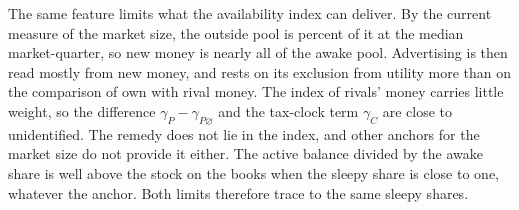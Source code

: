The same feature limits what the availability index can deliver. By the current measure of the market size, the outside pool is  percent of it at the median market-quarter, so new money is nearly all of the awake pool. Advertising is then read mostly from new money, and rests on its exclusion from utility more than on the comparison of own with rival money. The index of rivals' money carries little weight, so the difference $\gamma_{P} - \gamma_{P\varnothing}$ and the tax-clock term $\gamma_C$ are close to unidentified. The remedy does not lie in the index, and other anchors for the market size do not provide it either. The active balance divided by the awake share is well above the stock on the books when the sleepy share is close to one, whatever the anchor. Both limits therefore trace to the same sleepy shares. %
